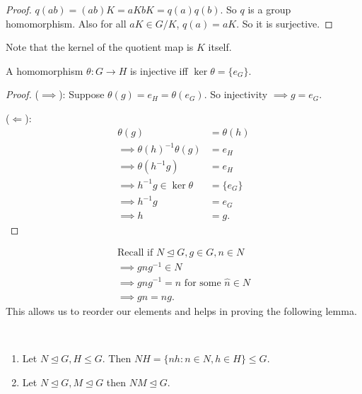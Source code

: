 \begin{proof}
  $q(ab) = (ab)K = aKbK = q(a)q(b)$. So $q$ is a group homomorphism. Also for all $aK \in G/K$, $q(a) = aK$. So it is surjective.
\end{proof}

Note that the kernel of the quotient map is $K$ itself.

\begin{lemma}
\protect\hypertarget{lem:thirteen}{}\label{lem:thirteen}A homomorphism $\theta : G \to H$ is injective iff $\ker \theta = \{ e_G \}$.
\end{lemma}

\begin{proof}
($\implies$): Suppose $\theta(g) = e_H = \theta (e_G)$.
So injectivity $\implies g = e_G$.

($\Longleftarrow$): \begin{align*}
    \theta(g) &= \theta(h) \\
    \implies \theta(h)^{-1} \theta(g) &= e_H \\
    \implies \theta(h^{-1} g) &= e_H \\
    \implies h^{-1} g \in \ker \theta &= \{ e_G \} \\
    \implies h^{-1} g &= e_G \\
    \implies h &= g.
\end{align*}
\end{proof}

\begin{align*}
    \text{Recall if } N \trianglelefteq G, g \in G, n \in N \\
    \implies gng^{-1} \in N \\
    \implies gng^{-1} = \hat{n} \text{ for some } \hat{n} \in N \\
    \implies gn = \hat{n} g.
\end{align*}
This allows us to reorder our elements and helps in proving the following lemma.

\begin{lemma}
\protect\hypertarget{lem:fourteen}{}\label{lem:fourteen}
~\vspace*{-1.5\baselineskip}
  \begin{enumerate}
  \def\labelenumi{\roman{enumi}.}
  \item
    Let $N \trianglelefteq G, H \leq G$.
    Then $NH = \{ nh : n \in N, h \in H \} \leq G$.
  \item
    Let $N \trianglelefteq G, M \trianglelefteq G$ then $NM \trianglelefteq G$.
  \end{enumerate}
\end{lemma}

